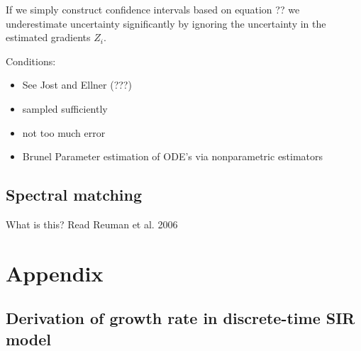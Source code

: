 \documentclass{article}
\begin{document}
If we simply construct confidence intervals based on equation ?? we underestimate uncertainty significantly by ignoring the uncertainty in the estimated gradients $Z_i$.

Conditions:
\begin{itemize}
	\item See Jost and Ellner (???)
	\item sampled sufficiently
	\item not too much error
	\item Brunel Parameter estimation of ODE’s via nonparametric estimators
\end{itemize}



\subsection{Spectral matching}

What is this? Read Reuman et al. 2006




\pagebreak

\section{Appendix}

\subsection{Derivation of growth rate in discrete-time SIR model}
\end{document}
